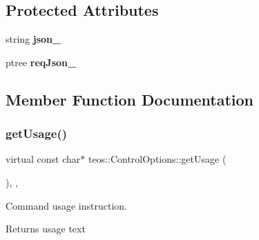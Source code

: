 \subsection*{Protected Attributes}
\begin{DoxyCompactItemize}
\item 
\mbox{\label{classteos_1_1_control_options_a385705bd05cf4cc33892f51737585f9b}} 
string {\bfseries json\+\_\+}
\item 
\mbox{\label{classteos_1_1_control_options_aef27b07fd43f5e553f20138deb57657a}} 
ptree {\bfseries req\+Json\+\_\+}
\end{DoxyCompactItemize}


\subsection{Member Function Documentation}
\mbox{\label{classteos_1_1_control_options_a0aa5671f9bc750ed5280c26c543874f3}} 
\subsubsection{\texorpdfstring{get\+Usage()}{getUsage()}}
{\footnotesize\ttfamily virtual const char$\ast$ teos\+::\+Control\+Options\+::get\+Usage (\begin{DoxyParamCaption}{ }\end{DoxyParamCaption})\hspace{0.3cm}{\ttfamily [inline]}, {\ttfamily [protected]}, {\ttfamily [virtual]}}



Command \textquotesingle{}usage\textquotesingle{} instruction. 

\begin{DoxyReturn}{Returns}
usage text 
\end{DoxyReturn}


